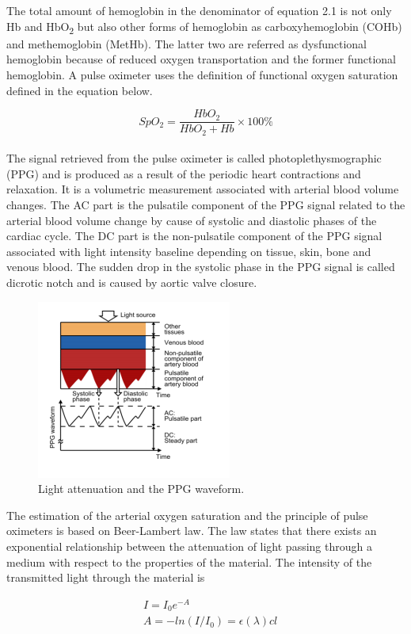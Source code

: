 \documentclass{report}
\begin{document}
\noindent
The total amount of hemoglobin in the denominator of equation 2.1 is not only Hb and HbO\textsubscript{2} but also other forms of hemoglobin as carboxyhemoglobin (COHb) and methemoglobin (MetHb). The latter two are referred as dysfunctional hemoglobin because of reduced oxygen transportation and the former functional hemoglobin. A pulse oximeter uses the definition of functional oxygen saturation defined in the equation below.

\begin{equation}
SpO_{2} = \frac{HbO_{2}}{HbO_{2} + Hb} \times 100 \%
\end{equation}
\noindent
\\
The signal retrieved from the pulse oximeter is called photoplethysmographic (PPG) and is produced as a result of the periodic heart contractions and relaxation. It is a volumetric measurement associated with arterial blood volume changes. The AC part is the pulsatile component of the PPG signal related to the arterial blood volume change by cause of systolic and diastolic phases of the cardiac cycle. The DC part is the non-pulsatile component of the PPG signal associated with light intensity baseline depending on tissue, skin, bone and venous blood. The sudden drop in the systolic phase in the PPG signal is called dicrotic notch and is caused by aortic valve closure.

\begin{figure}[H]
\centering
  \includegraphics[width=.39\linewidth]{ppgwave}
  \caption{Light attenuation and the PPG waveform.}
\end{figure}

\noindent
The estimation of the arterial oxygen saturation and the principle of pulse oximeters is based on Beer-Lambert law. The law states that there exists an exponential relationship between the attenuation of light passing through a medium with respect to the properties of the material. The intensity of the transmitted light through the material is

\begin{equation}
\begin{split}
& I = I_{0}e^{-A} \\
& A = -ln(I/I_{0}) = \epsilon(\lambda) c l
\end{split}
\end{equation}
\end{document}
